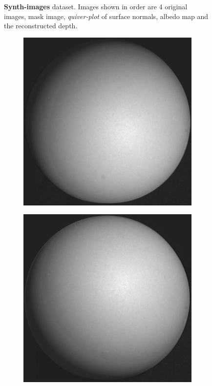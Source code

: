 \documentclass[11pt]{article}
\begin{document}
\begin{figure}[!hbt]
  \caption{\textbf{Synth-images} dataset. Images shown in order are 4 original images, mask image, \emph{quiver-plot} of surface normals, albedo map and the reconstructed depth.}
  \label{fig4}
  \end{figure}

\begin{figure}[!hbt]
\centering
  \vspace{-5pt}
  \begin{subfigure}[h]{0.3\textwidth}
    \centering
    \includegraphics[width = \textwidth]{../sphere-images/real1.jpg}
  \end{subfigure} 
    \begin{subfigure}[h]{0.3\textwidth}
    \centering
    \includegraphics[width = \textwidth]{../sphere-images/real2.jpg}

\end{subfigure}
\end{figure}
\end{document}
